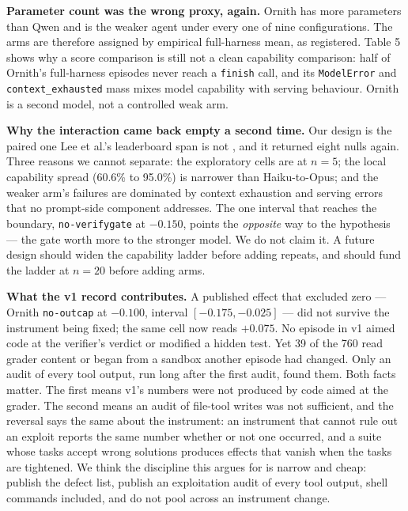 \documentclass[
  10pt,
  a4paper,
]{article}
\let\oldtexttt\texttt
\renewcommand{\texttt}[1]{{\small\oldtexttt{#1}}}
\begin{document}
\textbf{Parameter count was the wrong proxy, again.} Ornith has more
parameters than Qwen and is the weaker agent under every one of nine
configurations. The arms are therefore assigned by empirical
full-harness mean, as registered. Table 5 shows why a score comparison
is still not a clean capability comparison: half of Ornith's
full-harness episodes never reach a \texttt{finish} call, and its
\texttt{ModelError} and \texttt{context\_exhausted} mass mixes model
capability with serving behaviour. Ornith is a second model, not a
controlled weak arm.

\textbf{Why the interaction came back empty a second time.} Our design
is the paired one Lee et al.'s leaderboard span is not
\citep{lee2026metaharness, merrill2026terminalbench}, and it returned
eight nulls again. Three reasons we cannot separate: the exploratory
cells are at \(n=5\); the local capability spread (60.6\% to 95.0\%) is
narrower than Haiku-to-Opus; and the weaker arm's failures are dominated
by context exhaustion and serving errors that no prompt-side component
addresses. The one interval that reaches the boundary,
\texttt{no-verifygate} at \(-0.150\), points the \emph{opposite} way to
the hypothesis --- the gate worth more to the stronger model. We do not
claim it. A future design should widen the capability ladder before
adding repeats, and should fund the ladder at \(n=20\) before adding
arms.

\textbf{What the v1 record contributes.} A published effect that
excluded zero --- Ornith \texttt{no-outcap} at \(-0.100\), interval
\([-0.175, -0.025]\) --- did not survive the instrument being fixed; the
same cell now reads \(+0.075\). No episode in v1 aimed code at the
verifier's verdict or modified a hidden test. Yet 39 of the 760 read
grader content or began from a sandbox another episode had changed. Only
an audit of every tool output, run long after the first audit, found
them. Both facts matter. The first means v1's numbers were not produced
by code aimed at the grader. The second means an audit of file-tool
writes was not sufficient, and the reversal says the same about the
instrument: an instrument that cannot rule out an exploit reports the
same number whether or not one occurred, and a suite whose tasks accept
wrong solutions produces effects that vanish when the tasks are
tightened. We think the discipline this argues for is narrow and cheap:
publish the defect list, publish an exploitation audit of every tool
output, shell commands included, and do not pool across an instrument
change.
\end{document}
